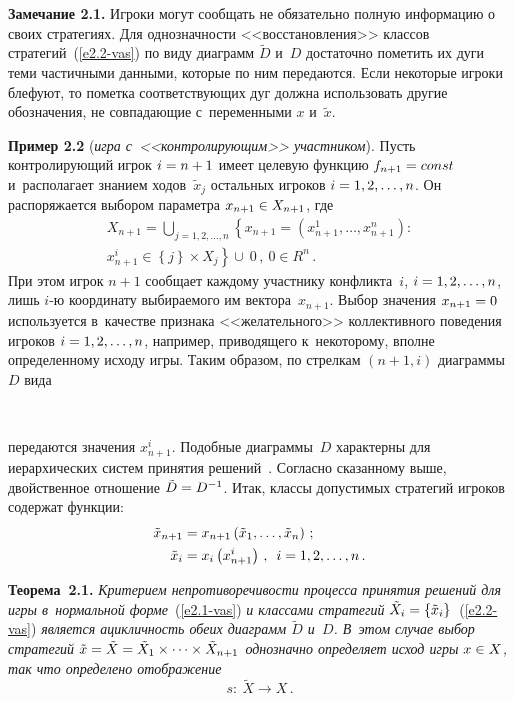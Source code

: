 \begin{multicols}{2}
    \noindent
    \textbf{Замечание 2.1.} Игроки могут сообщать не обязательно полную
информацию о своих стратегиях. Для однозначности <<восстановления>> классов
стратегий~(\ref{e2.2-vas}) по виду диаграмм $\tilde{D}$ и~$D$ достаточно пометить их
дуги теми частичными данными, которые по ним передаются. Если некоторые
игроки блефуют, то пометка соответствующих дуг должна использовать другие
обозначения, не совпадающие с~переменными $x$ и~$\tilde{x}$.

    \smallskip

    \noindent
    \textbf{Пример 2.2} (\textit{игра с~<<контролирующим>> участником}).
Пусть контролирующий игрок $i\hm= n\hm+1$ имеет целевую функцию
$f_{n+1}\hm= const$ и~располагает знанием ходов~$\tilde{x}_j$ остальных игроков $i\hm= 1,2,\ldots, n$. Он
распоряжается выбором параметра $x_{n+1}\hm\in X_{n+1}$, где
    \begin{multline*}
    X_{n+1} =\mathop{\bigcup}\limits_{j=1,2,\ldots, n} \left\{ x_{n+1} =\left( x^1_{n+1},\ldots ,
x^n_{n+1}\right):\right.\\
\left. x^i_{n+1}\in \left\{ j\right\} \times X_j\right\} \cup\ 0\,,\ 0\in R^n\,.
    \end{multline*}
При этом игрок $n+1$ сообщает каждому участнику конфликта~$i$, $i\hm=
1,2,\ldots, n$, лишь $i$-ю координату выбираемого им вектора~$x_{n+1}$. Выбор
значения $x_{n+1}\hm=0$ используется в~качестве признака <<желательного>>
коллективного поведения игроков $i\hm=1,2,\ldots, n$, например, приводящего
к~некоторому, вполне определенному исходу игры. Таким образом, по стрелкам
$(n+1,i)$ диаграммы~$D$ вида
    \begin{center}  %
\vspace*{8pt}
\mbox{%
 \epsfxsize=59.927mm
 }
\end{center}
\vspace*{6pt}

\noindent
     передаются значения $x_{n+1}^i$. Подобные диаграммы~$D$
характерны для иерархических систем принятия решений~\cite{15-vas}.
Согласно сказанному выше, двойственное отношение $\tilde{D}\hm= D^{-1}$.
Итак, классы допустимых стратегий игроков содержат функции:
    \begin{align*}
    \tilde{x}_{n+1} &= x_{n+1}\left(\tilde{x}_1,\ldots, \tilde{x}_n\right)\,;\\
    \tilde{x}_i &= x_i\left( x^i_{n+1}\right)\,,\enskip i=1,2,\ldots, n\,.
    \end{align*}

    \noindent
    \textbf{Теорема~2.1.} \textit{Критерием непротиворечивости процесса
принятия решений для игры в~нормальной форме}~(\ref{e2.1-vas}) \textit{и классами
стратегий} $\tilde{X}_i\hm= \left\{ \tilde{x}_i\right\}$~(\ref{e2.2-vas}) \textit{является
ацик\-лич\-ность обеих диаграмм $\tilde{D}$ и~$D$. В~этом случае выбор стратегий
$\tilde{x}\hm= \tilde{X}\hm= \tilde{X}_1\times\cdots \times \tilde{X}_{n+1}$ однозначно
определяет исход игры $x\hm\in X$, так что определено отображение}
    \begin{equation}
    s:\ \tilde{X}\to X\,.
    \label{e2.3-vas}
    \end{equation}



\end{multicols}
